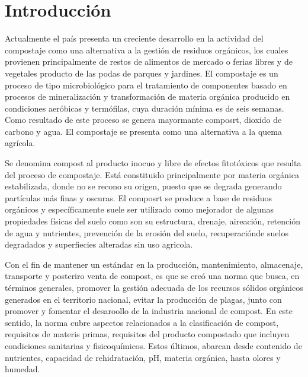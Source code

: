 \documentclass[12pt, letterpaper]{article}
\begin{document}
\section{Introducción}
Actualmente el país presenta un creciente desarrollo en la actividad del compostaje como una alternativa a la gestión de residuos orgánicos, los cuales provienen principalmente de restos de alimentos de mercado o ferias libres y de vegetales producto de las podas de parques y jardines. El compostaje es un proceso de tipo microbiológico para el tratamiento de componentes basado en procesos de mineralización y transformación de materia orgánica producido en condiciones aeróbicas y termófilas, cuya duración mínima es de seis semanas. Como resultado de este proceso se genera mayormante composrt, dioxido de carbono y agua. El compostaje se presenta como una alternativa a la quema agrícola.
\par
Se denomina compost al producto inocuo y libre de efectos fitotóxicos que resulta del proceso de compostaje. Está constituido principalmente por materia orgánica estabilizada, donde no se recono su origen, puesto que se degrada generando partículas más finas y oscuras. El composrt se produce a base de residuos orgánicos y específicamente suele ser utilizado como mejorador de algunas propiedades físicas del suelo como son su estructura, drenaje, aireación, retención de agua y nutrientes, prevención de la erosión del suelo, recuperaciónde suelos degradados y superfiecies alteradas sin uso agricola.
\par
Con el fin de mantener un estándar en la producción, mantenimiento, almacenaje, transporte y posteriro venta de compost, es que se creó una norma que busca, en términos generales, promover la gestión adecuada de los recursos sólidos orgánicos generados en el territorio nacional, evitar la producción de plagas, junto con promover y fomentar el desaroollo de la industria nacional de compost. En este sentido, la norma cubre aspectos relacionados a la clasificación de compost, requisitos de materis primas, requisitos del producto compostado que incluyen condiciones sanitarias y fisicoquímicos. Estos últimos, abarcan desde contenido de nutrientes, capacidad de rehidratación, pH, materia orgánica, hasta olores y humedad.
\par
\end{document}
